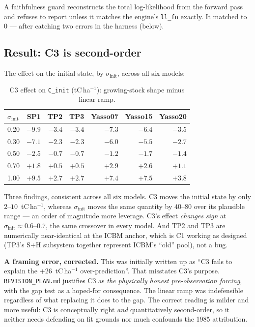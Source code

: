 \documentclass[11pt]{article}
\newcommand{\sinit}{\sigma_{\mathrm{init}}}
\begin{document}
A faithfulness guard reconstructs the total log-likelihood from the forward pass and refuses to
report unless it matches the engine's \texttt{ll\_fn} exactly. It matched to $0$ --- after
catching two errors in the harness (below).

\subsection{Result: C3 is second-order}
The effect on the initial state, by $\sinit$, across all six models:

\begin{table}[H]\centering\small
\caption{C3 effect on \texttt{C\_init} (tC\,ha$^{-1}$): growing-stock shape minus linear ramp.}
\begin{tabular}{lrrrrrr}\toprule
$\sinit$ & SP1 & TP2 & TP3 & Yasso07 & Yasso15 & Yasso20\\\midrule
0.20 & $-9.9$ & $-3.4$ & $-3.4$ & $-7.3$ & $-6.4$ & $-3.5$\\
0.30 & $-7.1$ & $-2.3$ & $-2.3$ & $-6.0$ & $-5.5$ & $-2.7$\\
0.50 & $-2.5$ & $-0.7$ & $-0.7$ & $-1.2$ & $-1.7$ & $-1.4$\\
0.70 & $+1.8$ & $+0.5$ & $+0.5$ & $+2.9$ & $+2.6$ & $+1.1$\\
1.00 & $+9.5$ & $+2.7$ & $+2.7$ & $+7.4$ & $+7.5$ & $+3.8$\\\bottomrule
\end{tabular}
\end{table}

Three findings, consistent across all six models. C3 moves the initial state by only
$2$--$10$~tC\,ha$^{-1}$, whereas $\sinit$ moves the same quantity by $40$--$80$ over its
plausible range --- an order of magnitude more leverage. C3's effect \emph{changes sign} at
$\sinit \approx 0.6$--$0.7$, the same crossover in every model. And TP2 and TP3 are numerically
near-identical at the ICBM anchor, which is C1 working as designed (TP3's S$+$H subsystem
together represent ICBM's ``old'' pool), not a bug.

\begin{caveat}
\textbf{A framing error, corrected.} This was initially written up as ``C3 fails to explain the
$+26$~tC\,ha$^{-1}$ over-prediction''. That misstates C3's purpose. \texttt{REVISION\_PLAN.md}
justifies C3 as \emph{the physically honest pre-observation forcing}, with the gap test as a
hoped-for consequence. The linear ramp was indefensible regardless of what replacing it does to
the gap. The correct reading is milder and more useful: C3 is conceptually right \emph{and}
quantitatively second-order, so it neither needs defending on fit grounds nor much confounds the
1985 attribution.
\end{caveat}
\end{document}
